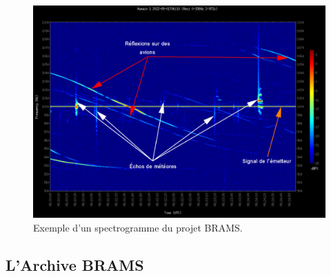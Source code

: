 \documentclass[11pt]{article}
\begin{document}
\begin{figure}[t]
    \begin{center}
        \includegraphics[scale=0.29]{spectrogramme_legend.png}
        \caption{Exemple d'un spectrogramme du projet BRAMS.}
    \end{center}
\end{figure}

\subsection{L'Archive BRAMS}
\end{document}
